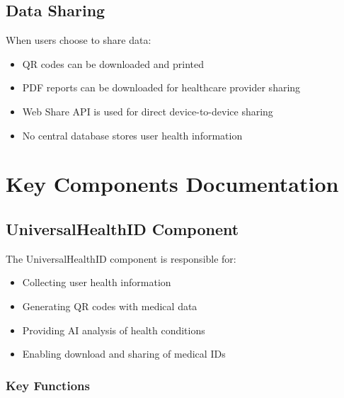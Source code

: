 \documentclass[12pt,a4paper]{report}
\begin{document}
\section{Data Sharing}
When users choose to share data:
\begin{itemize}
    \item QR codes can be downloaded and printed
    \item PDF reports can be downloaded for healthcare provider sharing
    \item Web Share API is used for direct device-to-device sharing
    \item No central database stores user health information
\end{itemize}

\chapter{Key Components Documentation}

\section{UniversalHealthID Component}
The UniversalHealthID component is responsible for:
\begin{itemize}
    \item Collecting user health information
    \item Generating QR codes with medical data
    \item Providing AI analysis of health conditions
    \item Enabling download and sharing of medical IDs
\end{itemize}

\subsection{Key Functions}
\end{document}
